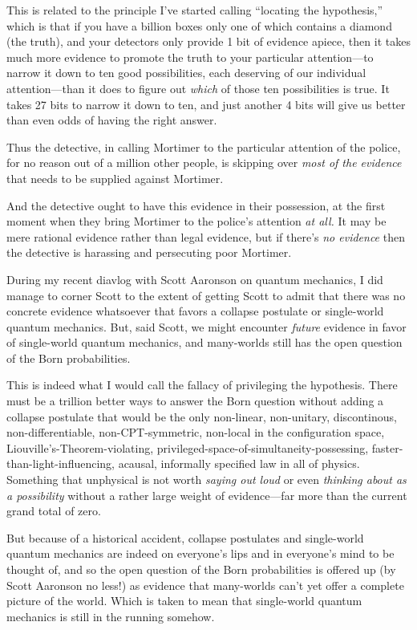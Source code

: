 {
 This is related to the principle I've started
calling ``locating the hypothesis,''
which is that if you have a billion boxes only one of which contains a
diamond (the truth), and your detectors only provide 1 bit of evidence
apiece, then it takes much more evidence to promote the truth to your
particular attention---to narrow it down to ten good possibilities,
each deserving of our individual attention---than it does to figure out
\textit{which} of those ten possibilities is true. It takes 27 bits to
narrow it down to ten, and just another 4 bits will give us better than
even odds of having the right answer.}

{
 Thus the detective, in calling Mortimer to the particular
attention of the police, for no reason out of a million other people,
is skipping over \textit{most of the evidence} that needs to be
supplied against Mortimer.}

{
 And the detective ought to have this evidence in their possession,
at the first moment when they bring Mortimer to the
police's attention \textit{at all.} It may be mere
rational evidence rather than legal evidence, but if
there's \textit{no evidence} then the detective is
harassing and persecuting poor Mortimer.}

{
 During my recent diavlog with Scott Aaronson on quantum mechanics,
I did manage to corner Scott to the extent of getting Scott to admit
that there was no concrete evidence whatsoever that favors a collapse
postulate or single-world quantum mechanics. But, said Scott, we might
encounter \textit{future} evidence in favor of single-world quantum
mechanics, and many-worlds still has the open question of the Born
probabilities.}

{
 This is indeed what I would call the fallacy of privileging the
hypothesis. There must be a trillion better ways to answer the Born
question without adding a collapse postulate that would be the only
non-linear, non-unitary, discontinous, non-differentiable,
non-CPT-symmetric, non-local in the configuration space,
Liouville's-Theorem-violating,
privileged-space-of-simultaneity-possessing,
faster-than-light-influencing, acausal, informally specified law in all
of physics. Something that unphysical is not worth \textit{saying out
loud} or even \textit{thinking about as a possibility} without a rather
large weight of evidence---far more than the current grand total of
zero.}

{
 But because of a historical accident, collapse postulates and
single-world quantum mechanics are indeed on everyone's
lips and in everyone's mind to be thought of, and so
the open question of the Born probabilities is offered up (by Scott
Aaronson no less!) as evidence that many-worlds can't
yet offer a complete picture of the world. Which is taken to mean that
single-world quantum mechanics is still in the running somehow.}

